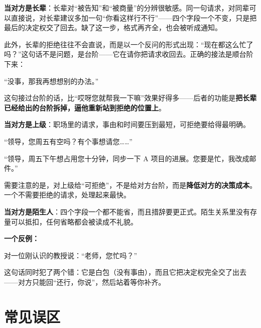 \textbf{当对方是长辈}：长辈对“被告知”和“被商量”的分辨很敏感。同一句请求，对同辈可以直接说，对长辈建议多加一句“你看这样行不行”——四个字段一个不变，只是把最后的决定权交了回去。缺了这一步，格式再齐全，也会被听成通知。

此外，长辈的拒绝往往不会直说，而是以一个反问的形式出现：“现在都这么忙了吗？”这句话不是问题，是台阶——它在请你把请求收回去。正确的接法是顺台阶下来：

\begin{mdquote}
“没事，那我再想想别的办法。”
\end{mdquote}

这句接过台阶的话，比“哎呀您就帮我一下嘛”效果好得多——后者的功能是\textbf{把长辈已经给出的台阶拆掉，逼他重新站到拒绝的位置上}。

\textbf{当对方是上级}：职场里的请求，事由和时间要压到最短，可拒绝要给得最明确。

\begin{mdquote}
“领导，您周五有空吗？有个事想请您……”

“领导，周五下午想占用您十分钟，同步一下 A 项目的进展。您要是忙，我改成邮件。”
\end{mdquote}

需要注意的是，对上级给“可拒绝”，不是给对方台阶，而是\textbf{降低对方的决策成本}。一个不需要拒绝的请求，处理起来最快。

\textbf{当对方是陌生人}：四个字段一个都不能省，而且措辞要更正式。陌生关系里没有存量可以抵扣，任何省略都会被读成不礼貌。

\textbf{一个反例：}

\begin{mdquote}
对一位刚认识的教授说：“老师，您忙吗？”
\end{mdquote}

这句话同时犯了两个错：它是白包（没有事由），而且它把决定权完全交了出去——对方只能回“还行，你说”，然后站着等你补齐。

\section[常见误区]{常见误区}




